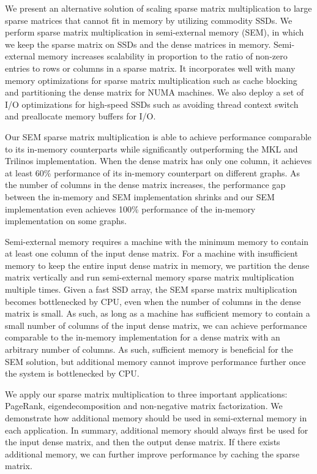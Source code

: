 We present an alternative solution of scaling sparse matrix multiplication
to large sparse matrices that cannot fit in memory by utilizing commodity SSDs.
We perform sparse matrix multiplication in semi-external memory (SEM), in which
we keep the sparse matrix on SSDs and the dense matrices in memory. Semi-external
memory increases scalability in proportion to the ratio of non-zero entries
to rows or columns in a sparse matrix. It incorporates well with many memory
optimizations for sparse matrix
multiplication such as cache blocking and partitioning the dense matrix for
NUMA machines. We also deploy a set of I/O optimizations for high-speed SSDs
such as avoiding thread context switch and preallocate memory buffers for I/O.

Our SEM sparse matrix multiplication is able to achieve performance
comparable to its in-memory counterparts while significantly outperforming
the MKL and Trilinos implementation. When the dense matrix has only one column,
it achieves at least 60\% performance of its in-memory counterpart on different
graphs. As the number of columns in the dense matrix increases, the performance
gap between the in-memory and SEM implementation shrinks and our SEM
implementation even achieves 100\% performance of the in-memory implementation
on some graphs.

Semi-external memory requires a machine with the minimum memory to contain
at least one column of the input dense matrix. For a machine with insufficient memory
to keep the entire input dense matrix in memory, we partition the dense matrix
vertically and run semi-external memory sparse matrix multiplication multiple
times. Given a fast SSD array, the SEM sparse matrix multiplication becomes
bottlenecked by CPU, even when the number of columns in the dense matrix
is small. As such, as long as a machine has sufficient memory to contain
a small number of columns of the input dense matrix, we can achieve performance
comparable to the in-memory implementation for a dense matrix with an arbitrary
number of columns. As such, sufficient memory is beneficial for the SEM solution,
but additional memory cannot improve performance further once the system is
bottlenecked by CPU.

We apply our sparse matrix multiplication to three important applications:
PageRank, eigendecomposition and non-negative matrix factorization. We demonstrate
how additional memory should be used in semi-external memory in each application.
In summary, additional memory should always first be used for the input dense
matrix, and then the output dense matrix. If there exists additional memory,
we can further improve performance by caching the sparse matrix.
